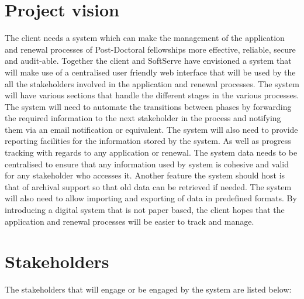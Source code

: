 \documentclass[12pt]{article}
\begin{document}
\section{Project vision}
\vspace{0.2in}
The client needs a system which can make the management of the application and renewal processes of Post-Doctoral fellowships more effective, reliable, secure and audit-able. Together the client and SoftServe have envisioned a system that will make use of a centralised user friendly web interface that will be used by the all the stakeholders involved in the application and renewal processes. The system will have various sections that handle the different stages in the various processes. The system will need to automate the transitions between phases by forwarding the required information to the next stakeholder in the process and notifying them via an email notification or equivalent. The system will also need to provide reporting facilities for the information stored by the system. As well as progress tracking with regards to any application or renewal. The system data needs to be centralised to ensure that any information used by system is cohesive and valid for any stakeholder who accesses it. Another feature the system should host is that of archival support so that old data can be retrieved if needed. The system will also need to allow importing and exporting of data in predefined formats. By introducing a digital system that is not paper based, the client hopes that the application and renewal processes will be easier to track and manage.
\vspace{0.5in}

\newpage
\section{Stakeholders}

The stakeholders that will engage or be engaged by the system are listed below:
\end{document}
